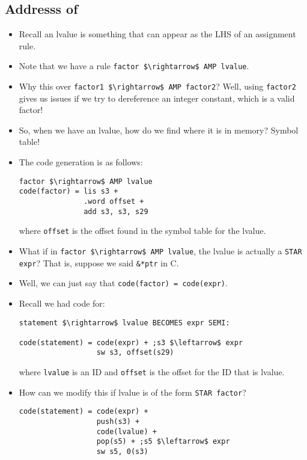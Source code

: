 \documentclass[12pt]{article}
\begin{document}
\begin{itemize}
        \subsection{Addresss of}
        \begin{itemize}
            \item Recall an lvalue is something that can appear as the LHS of an assignment rule.
            \item Note that we have a rule \lstinline[mathescape]{factor $\rightarrow$ AMP lvalue}.
            \item Why this over \lstinline[mathescape]{factor1 $\rightarrow$ AMP factor2}?  Well, using \lstinline[mathescape]{factor2} gives us issues if we try to dereference an integer constant, which is a valid factor!
            \item So, when we have an lvalue, how do we find where it is in memory?  Symbol table!
            \item The code generation is as follows:
\begin{lstlisting}[mathescape, numbers=none, breaklines=true]
factor $\rightarrow$ AMP lvalue
code(factor) = lis s3 +
               .word offset +
               add s3, s3, s29
\end{lstlisting}
            where \lstinline[mathescape]{offset} is the offset found in the symbol table for the lvalue.
            \item What if in \lstinline[mathescape]{factor $\rightarrow$ AMP lvalue}, the lvalue is actually a \lstinline[mathescape]{STAR expr}?  That is, suppose we said \lstinline[mathescape]{&*ptr} in C.
            \item Well, we can just say that \lstinline[mathescape]{code(factor) = code(expr)}.
            \item Recall we had code for:
\begin{lstlisting}[mathescape, numbers=none, breaklines=true]
statement $\rightarrow$ lvalue BECOMES expr SEMI:

code(statement) = code(expr) + ;s3 $\leftarrow$ expr
                  sw s3, offset(s29)
\end{lstlisting}
            where \lstinline[mathescape]{lvalue} is an ID and \lstinline[mathescape]{offset} is the offset for the ID that is lvalue.
            \item How can we modify this if lvalue is of the form \lstinline[mathescape]{STAR factor}?
\begin{lstlisting}[mathescape, numbers=none, breaklines=true]
code(statement) = code(expr) + 
                  push(s3) + 
                  code(lvalue) + 
                  pop(s5) + ;s5 $\leftarrow$ expr
                  sw s5, 0(s3)
\end{lstlisting}
        \end{itemize}
       

\end{itemize}
\end{document}
